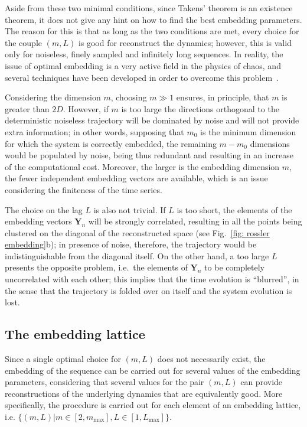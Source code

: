Aside from these two minimal conditions, since Takens' theorem is an existence theorem, it does not
give any hint on how to find the best embedding parameters. The reason for this is that as long as the
two conditions are met, every choice for the couple $(m,L)$ is good for reconstruct the dynamics;
however, this is valid only for noiseless, finely sampled and infinitely long sequences. In reality,
the issue of optimal embedding is a very active field in the physics of chaos, and several techniques
have been developed in order to overcome this problem~\cite{ref:perinelli2018identification,ref:perinelli2020chasing,ref:casdagli1991state}.

Considering the dimension $m$, choosing $m\gg1$ ensures, in principle, that $m$ is
greater than $2D$. However, if $m$ is too large the directions orthogonal to the deterministic noiseless
trajectory will be dominated by noise and will not provide extra information; in other words, supposing
that $m_0$ is the minimum dimension for which the system is correctly embedded, the remaining $m-m_0$
dimensions would be populated by noise, being thus redundant and resulting in an increase of the
computational cost. Moreover, the larger is the embedding dimension $m$,
the fewer independent embedding vectors are available, which is an issue considering the finiteness
of the time series.

The choice on the lag $L$ is also not trivial. If $L$ is too short, the elements of the embedding vectors
$\mathbf{Y}_n$ will be strongly correlated, resulting in all the points being clustered on the
diagonal of the reconstructed space (see Fig.~\ref{fig: rossler embedding}b);
in presence of noise, therefore, the trajectory would be
indistinguishable from the diagonal itself. On the other hand, a too large $L$ presents the opposite
problem, i.e.\ the elements of $\mathbf{Y}_n$ to be completely uncorrelated with each other;
this implies that the time evolution is ``blurred'', in the sense that the trajectory is folded over on itself
and the system evolution is lost.


\subsection{The embedding lattice}\label{subsec: embedding lattice}

Since a single optimal choice for $(m,L)$ does
not necessarily exist, the embedding of the sequence can be carried out for several values of the
embedding parameters, considering that several values for the pair
$(m, L)$ can provide reconstructions of the underlying dynamics that are equivalently good.
More specifically, the procedure is carried out for each element of an embedding lattice, i.e.
$\{(m,L)|m\in[2,m_{\max}],L\in[1,L_{\max}]\}$.


